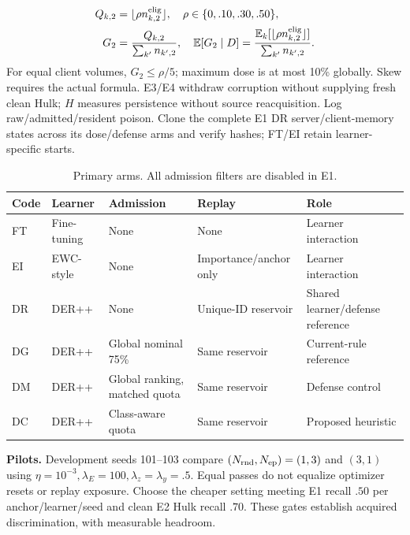 \documentclass[10pt,a4paper]{article}
\begin{document}
\begin{equation}
\begin{aligned}
Q_{k,2}&=\lfloor\rho n^{\rm elig}_{k,2}\rfloor,\quad \rho\in\{0,.10,.30,.50\},\\
G_2&=\frac{Q_{k,2}}{\sum_{k'} n_{k',2}},\quad
\mathbb E[G_2\mid D]=\frac{\mathbb E_k[\lfloor\rho n^{\rm elig}_{k,2}\rfloor]}{\sum_{k'} n_{k',2}}.
\end{aligned}
\label{eq:dose}
\end{equation}
For equal client volumes, $G_2\le\rho/5$; maximum dose is at most 10\% globally. Skew requires the actual formula. E3/E4 withdraw corruption without supplying fresh clean Hulk; $H$ measures persistence without source reacquisition. Log raw/admitted/resident poison. Clone the complete E1 DR server/client-memory states across its dose/defense arms and verify hashes; FT/EI retain learner-specific starts.

\begin{table}[htbp]
\centering\footnotesize
\caption{Primary arms. All admission filters are disabled in E1.}
\label{tab:arms}
\begin{tabularx}{\linewidth}{L{1.0cm}L{1.2cm}Y Y Y}
\toprule
Code & Learner & Admission & Replay & Role\\
\midrule
FT & Fine-tuning & None & None & Learner interaction\\
EI & EWC-style & None & Importance/anchor only & Learner interaction\\
DR & DER++ & None & Unique-ID reservoir & Shared learner/defense reference\\
DG & DER++ & Global nominal 75\% & Same reservoir & Current-rule reference\\
DM & DER++ & Global ranking, matched quota & Same reservoir & Defense control\\
DC & DER++ & Class-aware quota & Same reservoir & Proposed heuristic\\
\bottomrule
\end{tabularx}
\end{table}

\textbf{Pilots.} Development seeds 101--103 compare $(N_{\rm rnd},N_{\rm ep})=(1,3)$ and $(3,1)$ using $\eta=10^{-3},\lambda_E=100,\lambda_z=\lambda_y=.5$. Equal passes do not equalize optimizer resets or replay exposure. Choose the cheaper setting meeting E1 recall $.50$ per anchor/learner/seed and clean E2 Hulk recall $.70$. These gates establish acquired discrimination, with measurable headroom.
\end{document}
